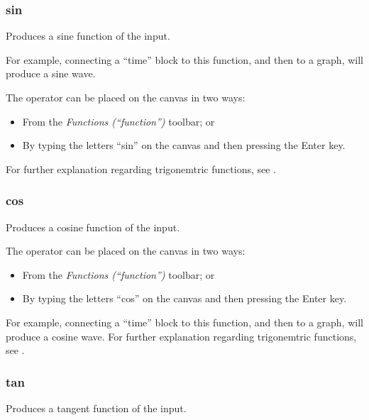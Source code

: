 \subsubsection{sin}


\label{Operation:sin} Produces a sine function of the input.

For example, connecting a ``time'' block to this function, and then
to a graph, will produce a sine wave.

The operator can be placed on the canvas in two ways:
\begin{itemize}
\item From the \emph{Functions (``function'')} toolbar; or 
\item By typing the letters ``sin'' on the canvas and then pressing the
Enter key. 
\end{itemize}
For further explanation regarding trigonemtric functions, see
.

\subsubsection{cos}

\label{Operation:cos} Produces a cosine function of the input.


The operator can be placed on the canvas in two ways:
\begin{itemize}
\item From the \emph{Functions (``function'')} toolbar; or 
\item By typing the letters ``cos'' on the canvas and then pressing the
Enter key.
\end{itemize}
For example, connecting a ``time'' block to this function, and then
to a graph, will produce a cosine wave. For further explanation regarding
trigonemtric functions, see .

\subsubsection{tan}


\label{Operation:tan} Produces a tangent function of the input.

